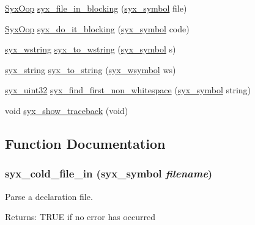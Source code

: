 \begin{CompactItemize}
\item 
\hyperlink{syx-types_8h_1121caba2d40b2ce090b640762744ccd}{SyxOop} \hyperlink{syx-utils_8c_1300f846803090b4be8b089229ec79ec}{syx\_\-file\_\-in\_\-blocking} (\hyperlink{syx-types_8h_9663af54b7b72f5d8be5f754ef356525}{syx\_\-symbol} file)
\item 
\hyperlink{syx-types_8h_1121caba2d40b2ce090b640762744ccd}{SyxOop} \hyperlink{syx-utils_8c_ea006a10f7a7358abc429ac047a35e5d}{syx\_\-do\_\-it\_\-blocking} (\hyperlink{syx-types_8h_9663af54b7b72f5d8be5f754ef356525}{syx\_\-symbol} code)
\item 
\hyperlink{syx-types_8h_049e6bf08a24efd298a398b5e8c27ead}{syx\_\-wstring} \hyperlink{syx-utils_8c_7b7039ddb05c03d77889a078649ccb2b}{syx\_\-to\_\-wstring} (\hyperlink{syx-types_8h_9663af54b7b72f5d8be5f754ef356525}{syx\_\-symbol} s)
\item 
\hyperlink{syx-types_8h_1bff1fd86072dd98849437bc9dcb35c3}{syx\_\-string} \hyperlink{syx-utils_8c_1cb75f3e31fcc89edebfbf8c7adcc822}{syx\_\-to\_\-string} (\hyperlink{syx-types_8h_6fab7c0dab70ca1ee8812c0b5a6e0819}{syx\_\-wsymbol} ws)
\item 
\hyperlink{syx-types_8h_eb2d8221bf07737360750e4c0ec66a99}{syx\_\-uint32} \hyperlink{syx-utils_8c_1835c001226820fab823c5966ed8f9ac}{syx\_\-find\_\-first\_\-non\_\-whitespace} (\hyperlink{syx-types_8h_9663af54b7b72f5d8be5f754ef356525}{syx\_\-symbol} string)
\item 
void \hyperlink{syx-utils_8c_30d1f880dd5a80049befd1dd2a95f0e7}{syx\_\-show\_\-traceback} (void)
\end{CompactItemize}


\subsection{Function Documentation}
\hypertarget{syx-utils_8c_1684cfdb905b7f4de7031d77bba8e6b3}{
\subsubsection{ syx\_\-cold\_\-file\_\-in ({\bf syx\_\-symbol} {\em filename})}}
\label{syx-utils_8c_1684cfdb905b7f4de7031d77bba8e6b3}


Parse a declaration file.

\begin{Desc}
\item[Returns:]TRUE if no error has occurred \end{Desc}



